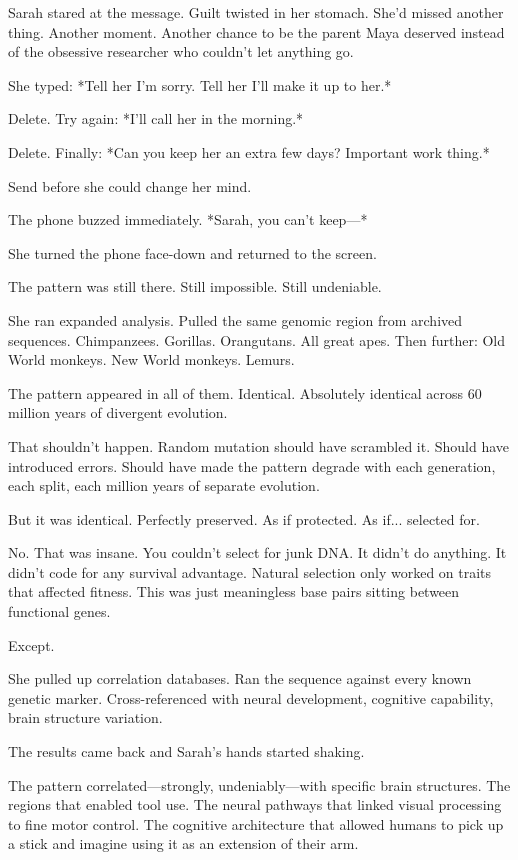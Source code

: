 Sarah stared at the message. Guilt twisted in her stomach. She'd missed another thing. Another moment. Another chance to be the parent Maya deserved instead of the obsessive researcher who couldn't let anything go.

She typed: *Tell her I'm sorry. Tell her I'll make it up to her.*

Delete. Try again: *I'll call her in the morning.*

Delete. Finally: *Can you keep her an extra few days? Important work thing.*

Send before she could change her mind.

The phone buzzed immediately. *Sarah, you can't keep—*

She turned the phone face-down and returned to the screen.

The pattern was still there. Still impossible. Still undeniable.

\scenebreak

She ran expanded analysis. Pulled the same genomic region from archived sequences. Chimpanzees. Gorillas. Orangutans. All great apes. Then further: Old World monkeys. New World monkeys. Lemurs.

The pattern appeared in all of them. Identical. Absolutely identical across 60 million years of divergent evolution.

That shouldn't happen. Random mutation should have scrambled it. Should have introduced errors. Should have made the pattern degrade with each generation, each split, each million years of separate evolution.

But it was identical. Perfectly preserved. As if protected. As if... selected for.

No. That was insane. You couldn't select for junk DNA. It didn't do anything. It didn't code for any survival advantage. Natural selection only worked on traits that affected fitness. This was just meaningless base pairs sitting between functional genes.

Except.

She pulled up correlation databases. Ran the sequence against every known genetic marker. Cross-referenced with neural development, cognitive capability, brain structure variation.

The results came back and Sarah's hands started shaking.

The pattern correlated—strongly, undeniably—with specific brain structures. The regions that enabled tool use. The neural pathways that linked visual processing to fine motor control. The cognitive architecture that allowed humans to pick up a stick and imagine using it as an extension of their arm.


